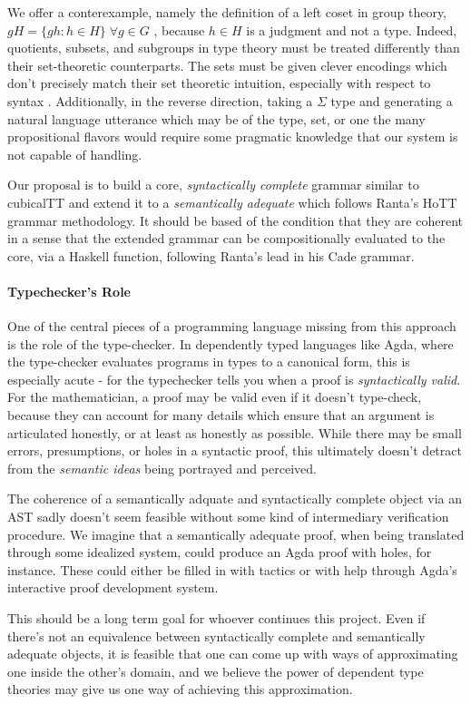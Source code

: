 We offer a conterexample, namely the definition of a left coset in group theory,
$gH = \{gh {:}h \in H\}\; \forall g \in G$ , because $h \in H$ is a judgment and
not a type. Indeed, quotients, subsets, and subgroups in type theory must be
treated differently than their set-theoretic counterparts. The sets must be
given clever encodings which don't precisely match their set theoretic
intuition, especially with respect to syntax \cite{zipperer2016formalization}.
Additionally, in the reverse direction, taking a $\Sigma$ type and generating a
natural language utterance which may be of the type, set, or one the many
propositional flavors would require some pragmatic knowledge that our system is
not capable of handling.

Our proposal is to build a core, \emph{syntactically complete} grammar similar
to cubicalTT and extend it to a \emph{semantically adequate} which follows
Ranta's HoTT grammar methodology. It should be based of the condition that they
are coherent in a sense that the extended grammar can be compositionally
evaluated to the core, via a Haskell function, following Ranta's lead in his
Cade grammar.

\paragraph{Typechecker's Role}

One of the central pieces of a programming language missing from this approach
is the role of the type-checker. In dependently typed languages like Agda, where
the type-checker evaluates programs in types to a canonical form, this is
especially acute - for the typechecker tells you when a proof is
\emph{syntactically valid}. For the mathematician, a proof may be valid even if
it doesn't type-check, because they can account for many details which ensure
that an argument is articulated honestly, or at least as honestly as possible.
While there may be small errors, presumptions, or holes in a syntactic proof,
this ultimately doesn't detract from the \emph{semantic ideas} being portrayed
and perceived.

The coherence of a semantically adquate and syntactically complete object via an
AST sadly doesn't seem feasible without some kind of intermediary verification
procedure. We imagine that a semantically adequate proof, when being translated
through some idealized system, could produce an Agda proof with holes, for
instance. These could either be filled in with tactics or with help through
Agda's interactive proof development system.

This should be a long term goal for whoever continues this project. Even if
there's not an equivalence between syntactically complete and semantically
adequate objects, it is feasible that one can come up with ways of approximating
one inside the other's domain, and we believe the power of dependent type
theories may give us one way of achieving this approximation.
